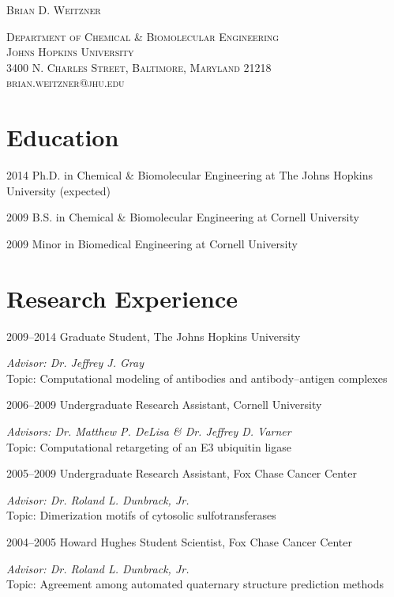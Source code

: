 \documentclass[12pt]{scrartcl}
\begin{document}
\begin{center}
\Large{\lsstyle \textsc{Brian D. Weitzner}}

\normalsize{\lsstyle \textsc{Department of Chemical \& Biomolecular Engineering \\
Johns Hopkins University \\
3400 N. Charles Street, Baltimore, Maryland 21218 \\
brian.weitzner@jhu.edu}}
\end{center}

\section{\lsstyle Education}

\begin{CV}
\item[2014] Ph.D. in Chemical \& Biomolecular Engineering at The Johns Hopkins University (expected)
\item[2009] B.S. in Chemical \& Biomolecular Engineering at Cornell University
\item[2009] Minor in Biomedical Engineering at Cornell University
\end{CV}

\section{\lsstyle Research Experience}
\begin{CV}
\item[2009--2014] Graduate Student, The Johns Hopkins University

\emph{Advisor: Dr. Jeffrey J. Gray} \\
Topic: Computational modeling of antibodies and antibody--antigen complexes

\item[2006--2009] Undergraduate Research Assistant, Cornell University

\emph{Advisors: Dr. Matthew P. DeLisa \& Dr. Jeffrey D. Varner} \\
Topic: Computational retargeting of an E3 ubiquitin ligase

\item[2005--2009] Undergraduate Research Assistant, Fox Chase Cancer Center

\emph{Advisor: Dr. Roland L. Dunbrack, Jr.} \\
Topic: Dimerization motifs of cytosolic sulfotransferases

\item[2004--2005] Howard Hughes Student Scientist, Fox Chase Cancer Center

\emph{Advisor: Dr. Roland L. Dunbrack, Jr.} \\
Topic: Agreement among automated quaternary structure prediction methods
\end{CV}
\end{document}
